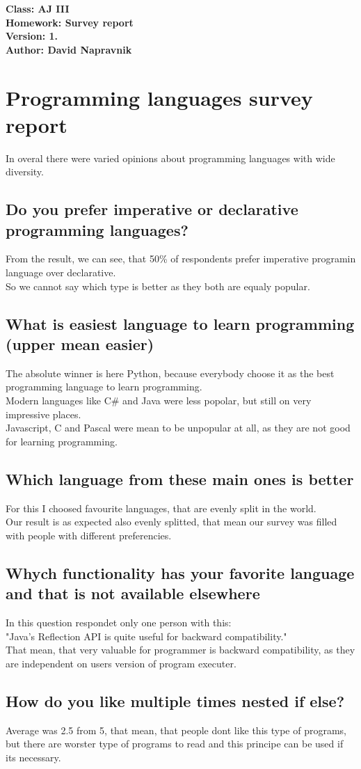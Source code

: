 \documentclass[a4paper]{article}
\begin{document}
\noindent
\textbf{Class: AJ III}\\
\textbf{Homework: Survey report}\\
\textbf{Version: 1.}\\
\textbf{Author: David Napravnik}

\section*{Programming languages survey report}
In overal there were varied opinions about programming languages with wide diversity.

\subsection*{Do you prefer imperative or declarative programming languages?}
From the result, we can see, that 50\% of respondents prefer imperative programin language over declarative.\\
So we cannot say which type is better as they both are equaly popular.




\subsection*{What is easiest language to learn programming (upper mean easier)}
The absolute winner is here Python, because everybody choose it as the best programming language to learn programming.\\
Modern languages like C\# and Java were less popolar, but still on very impressive places.\\
Javascript, C and Pascal were mean to be unpopular at all, as they are not good for learning programming.




\subsection*{Which language from these main ones is better}
For this I choosed favourite languages, that are evenly split in the world.\\
Our result is as expected also evenly splitted, that mean our survey was filled with people with different preferencies.



\subsection*{Whych functionality has your favorite language and that is not available elsewhere}
In this question respondet only one person with this:\\
"Java's Reflection API is quite useful for backward compatibility."\\
That mean, that very valuable for programmer is backward compatibility, as they are independent on users version of program executer.




\subsection*{How do you like multiple times nested if else?}
Average was 2.5 from 5, that mean, that people dont like this type of programs, but
there are worster type of programs to read and this principe can be used if its necessary.
\end{document}
